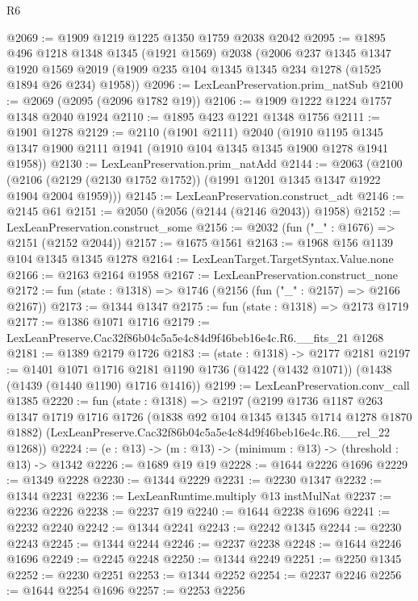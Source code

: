 \begin{lexlean}{R6}
\begin{coremodule}
@2069 := @1909 @1219 @1225 @1350 @1759 @2038 @2042
@2095 := @1895
    @496
    @1218
    @1348
    @1345
    (@1921 @1569)
    @2038
    (@2006
      @237
      @1345
      @1347
      @1920
      @1569
      @2019
      (@1909 @235 @104 @1345 @1345 @234 @1278 (@1525 @1894 @26 @234) @1958))
@2096 := LexLeanPreservation.prim_natSub
@2100 := @2069 (@2095 (@2096 @1782 @19))
@2106 := @1909 @1222 @1224 @1757 @1348 @2040 @1924
@2110 := @1895 @423 @1221 @1348 @1756
@2111 := @1901 @1278
@2129 := @2110
    (@1901 @2111)
    @2040
    (@1910 @1195 @1345 @1347 @1900 @2111 @1941 (@1910 @104 @1345 @1345 @1900 @1278 @1941 @1958))
@2130 := LexLeanPreservation.prim_natAdd
@2144 := @2063
    (@2100 (@2106 (@2129 (@2130 @1752 @1752)) (@1991 @1201 @1345 @1347 @1922 @1904 @2004 @1959)))
@2145 := LexLeanPreservation.construct_adt
@2146 := @2145 @61
@2151 := @2050 (@2056 (@2144 (@2146 @2043)) @1958)
@2152 := LexLeanPreservation.construct_some
@2156 := @2032 (fun ("_" : @1676) => @2151 (@2152 @2044))
@2157 := @1675 @1561
@2163 := @1968 @156 @1139 @104 @1345 @1345 @1278
@2164 := LexLeanTarget.TargetSyntax.Value.none
@2166 := @2163 @2164 @1958
@2167 := LexLeanPreservation.construct_none
@2172 := fun (state : @1318) => @1746 (@2156 (fun ("_" : @2157) => @2166 @2167))
@2173 := @1344 @1347
@2175 := fun (state : @1318) => @2173 @1719
@2177 := @1386 @1071 @1716
@2179 := LexLeanPreserve.Cac32f86b04c5a5e4c84d9f46beb16e4c.R6.__fits_21 @1268
@2181 := @1389 @2179 @1726
@2183 := (state : @1318) -> @2177 @2181
@2197 := @1401
    @1071
    @1716
    @2181
    @1190
    @1736
    (@1422 (@1432 @1071))
    (@1438 (@1439 (@1440 @1190) @1716 @1416))
@2199 := LexLeanPreservation.conv_call @1385
@2220 := fun (state : @1318) =>
  @2197
    (@2199
      @1736
      @1187
      @263
      @1347
      @1719
      @1716
      @1726
      (@1838 @92 @104 @1345 @1345 @1714 @1278 @1870 @1882)
      (LexLeanPreserve.Cac32f86b04c5a5e4c84d9f46beb16e4c.R6.__rel_22 @1268))
@2224 := (e : @13) -> (m : @13) -> (minimum : @13) -> (threshold : @13) -> @1342
@2226 := @1689 @19 @19
@2228 := @1644 @2226 @1696
@2229 := @1349 @2228
@2230 := @1344 @2229
@2231 := @2230 @1347
@2232 := @1344 @2231
@2236 := LexLeanRuntime.multiply @13 instMulNat
@2237 := @2236 @2226
@2238 := @2237 @19
@2240 := @1644 @2238 @1696
@2241 := @2232 @2240
@2242 := @1344 @2241
@2243 := @2242 @1345
@2244 := @2230 @2243
@2245 := @1344 @2244
@2246 := @2237 @2238
@2248 := @1644 @2246 @1696
@2249 := @2245 @2248
@2250 := @1344 @2249
@2251 := @2250 @1345
@2252 := @2230 @2251
@2253 := @1344 @2252
@2254 := @2237 @2246
@2256 := @1644 @2254 @1696
@2257 := @2253 @2256

\end{coremodule}
\end{lexlean}
